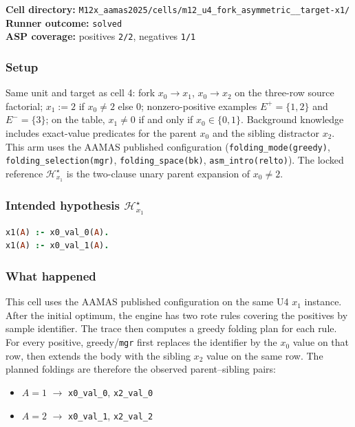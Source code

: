 \documentclass[11pt]{article}
\begin{document}
\textbf{Cell directory:} \texttt{M12x\_aamas2025/cells/m12\_u4\_fork\_asymmetric\_\_target-x1/}\\
\textbf{Runner outcome:} \texttt{solved}\\
\textbf{ASP coverage:} positives \texttt{2/2}, negatives \texttt{1/1}

\subsubsection{Setup}

Same unit and target as cell 4: fork \(x_0\to x_1\), \(x_0\to x_2\) on the three-row source factorial; \(x_1:=2\) if \(x_0\neq 2\) else \(0\); nonzero-positive examples \(E^+=\{1,2\}\) and \(E^-=\{3\}\); on the table, \(x_1\neq 0\) if and only if \(x_0\in\{0,1\}\). Background knowledge includes exact-value predicates for the parent \(x_0\) and the sibling distractor \(x_2\). This arm uses the AAMAS published configuration (\texttt{folding\_mode(greedy)}, \texttt{folding\_selection(mgr)}, \texttt{folding\_space(bk)}, \texttt{asm\_intro(relto)}). The locked reference \(\mathcal{H}_{x_1}^\star\) is the two-clause unary parent expansion of \(x_0\neq 2\).

\subsubsection{\texorpdfstring{Intended hypothesis \(\mathcal{H}_{x_1}^\star\)}{Intended hypothesis H-star(x1)}}

\begin{lstlisting}[style=logic,language=Prolog]
x1(A) :- x0_val_0(A).
x1(A) :- x0_val_1(A).
\end{lstlisting}

\subsubsection{What happened}

This cell uses the AAMAS published configuration on the same U4 \(x_1\) instance. After the initial optimum, the engine has two rote rules covering the positives by sample identifier. The trace then computes a greedy folding plan for each rule. For every positive, greedy/\texttt{mgr} first replaces the identifier by the \(x_0\) value on that row, then extends the body with the sibling \(x_2\) value on the same row. The planned foldings are therefore the observed parent--sibling pairs:

\begin{itemize}
  \item \(A=1\) \(\rightarrow\) \texttt{x0\_val\_0}, \texttt{x2\_val\_0}
  \item \(A=2\) \(\rightarrow\) \texttt{x0\_val\_1}, \texttt{x2\_val\_2}
\end{itemize}
\end{document}
